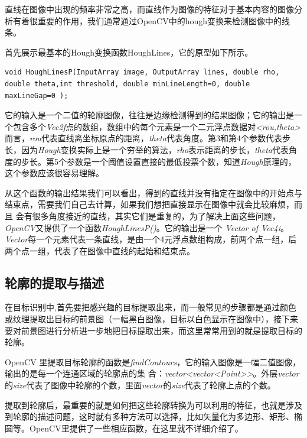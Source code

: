 \documentclass{XDBAthesis}
\begin{document}
直线在图像中出现的频率非常之高，而直线作为图像的特征对于基本内容的图像分析有着很重要的作用，我们通常通过OpenCV中的hough变换来检测图像中的线条。

首先展示最基本的Hough变换函数HoughLines，它的原型如下所示。
\begin{lstlisting}
void HoughLinesP(InputArray image, OutputArray lines, double rho, double theta,int threshold, double minLineLength=0, double maxLineGap=0 ); 
\end{lstlisting}

 

    它的输入是一个二值的轮廓图像，往往是边缘检测得到的结果图像；它的输出是一个包含多个\emph{Vec2f}点的数组，数组中的每个元素是一个二元浮点数据对\emph{<rou,theta>}而言，\emph{rou}代表直线离坐标原点的距离，\emph{theta}代表角度。第3和第4个参数代表步长，因为\emph{Hough}变换实际上是一个穷举的算法，\emph{rho}表示距离的步长，\emph{theta}代表角度的步长。第5个参数是一个阈值设置直接的最低投票个数，知道\emph{Hough}原理的，这个参数应该很容易理解。

   从这个函数的输出结果我们可以看出，得到的直线并没有指定在图像中的开始点与结束点，需要我们自己去计算，如果我们想把直接显示在图像中就会比较麻烦，而且 会有很多角度接近的直线，其实它们是重复的，为了解决上面这些问题，\emph{OpenCV}又提供了一个函数\emph{HoughLinesP()}。它的输出是一个 \emph{Vector of Vec4i}。\emph{Vector}每一个元素代表一条直线，是由一个4元浮点数组构成，前两个点一组，后两个点一组，代表了在图像中直线的起始和结束点。

\subsection{轮廓的提取与描述}

在目标识别中,首先要把感兴趣的目标提取出来，而一般常见的步骤都是通过颜色或纹理提取出目标的前景图（一幅黑白图像，目标以白色显示在图像中），接下来要对前景图进行分析进一步地把目标提取出来，而这里常常用到的就是提取目标的轮廓。

OpenCV 里提取目标轮廓的函数是\emph{findContours}，它的输入图像是一幅二值图像，输出的是每一个连通区域的轮廓点的集 合：\emph{vector<vector<Point>>}。外层\emph{vector}的\emph{size}代表了图像中轮廓的个数，里面\emph{vector}的\emph{size}代表了轮廓上点的个数。

提取到轮廓后，最重要的就是如何把这些轮廓转换为可以利用的特征，也就是涉及到轮廓的描述问题，这时就有多种方法可以选择，比如矢量化为多边形、矩形、椭圆等。OpenCV里提供了一些相应函数，在这里就不详细介绍了。 
\end{document}
